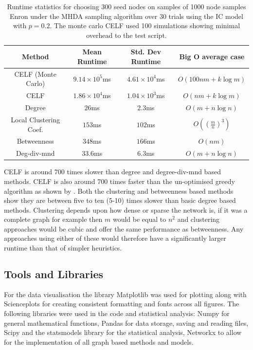 \documentclass{article}
\begin{document}
\begin{table}[h]
	\centering
	\begin{tabular}{|c|c|c|c|}
		\hline
		\textbf{Method}        & \textbf{Mean Runtime}  & \textbf{Std. Dev Runtime} & \textbf{Big O average case} \\
		\hline
		CELF (Monte Carlo)     & $9.14 \times 10^{5}$ms & $4.61 \times 10^4$ms      & $O(100nm + k \log m )$      \\
		CELF                   & $1.86 \times 10^4$ms   & $1.04 \times 10^3$ms      & $O(nm + k \log m)$          \\
		Degree                 & $26$ms                 & $2.3$ms                   & $O(m + n \log n)$           \\
		Local Clustering Coef. & $153$ms                & $102$ms                   & $O((\frac{m}{n})^3)$        \\
		Betweenness            & $348$ms                & $166$ms                   & $O(nm)$                     \\
		Deg-div-mnd            & $33.6$ms               & $6.3$ms                   & $O(m + n \log n)$           \\
		\hline
	\end{tabular}
	\caption{Runtime statistics for choosing 300 seed nodes on samples of 1000 node samples Enron under the MHDA sampling algorithm over 30 trials using the IC model with $p=0.2$. The monte carlo CELF used 100 simulations showing minimal overhead to the test script.}
\end{table}

CELF is around 700 times slower than degree and degree-div-mnd based methods.
CELF is also around 700 times faster than the un-optimised greedy algorithm as shown by \cite{celf}.
Both the clustering and betweenness based methods show they are between five to ten (5-10) times slower than basic degree based methods.
Clustering depends upon how dense or sparse the network is, if it was a complete graph for example then $m$ would be equal to $n^2$ and clustering approaches would be cubic and offer the same performance as betweenness.
Any approaches using either of these would therefore have a significantly larger runtime than that of simpler heuristics.

\subsection{Tools and Libraries}
For the data visualisation the library Matplotlib \cite{matplotlib} was used for plotting along with Scienceplots \cite{SciencePlots} for creating consistent formatting and fonts across all figures.
The following libraries were used in the code and statistical analysis: Numpy \cite{numpy} for general mathematical functions, Pandas \cite{pandas} for data storage, saving and reading files, Scipy \cite{scipy} and the statsmodels library \cite{statsmodels} for the statistical analysis, Networkx \cite{networkx} to allow for the implementation of all graph based methods and models.
\end{document}
